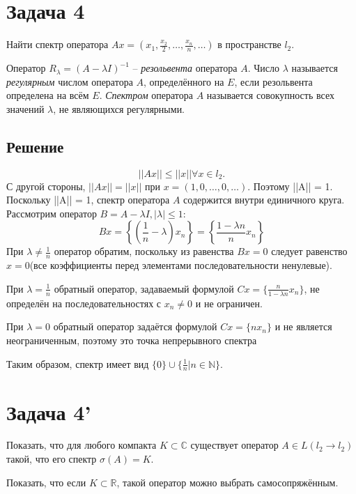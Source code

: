 \documentclass[11pt]{article}
\newcounter{th}\setcounter{th}{0}
\begin{document}
\section{Задача 4}
\label{sec:org17967b7}
Найти спектр оператора \(Ax = (x_1, \frac{x_2}2, \ldots, \frac{x_n}n, \ldots)\) в пространстве \(l_2\).

Оператор \(R_{\lambda} = (A - \lambda I)^{-1}\) -- \emph{резольвента} оператора \(A\). Число \(\lambda\) называется \emph{регулярным} числом оператора \(A\), определённого на \(E\), если резольвента определена на всём \(E\). \emph{Спектром} оператора \(A\) называется совокупность всех значений \(\lambda\), не являющихся регулярными.
\subsection{Решение}
\label{sec:org160b67c}
\begin{equation*}
||Ax|| \leq ||x|| \forall x \in l_2.
\end{equation*}
С другой стороны, $||Ax|| = ||x||$ при $x = (1, 0, \ldots, 0, \ldots)$. Поэтому ||A|| = 1.
Поскольку ||A|| = 1, спектр оператора \(A\) содержится внутри единичного круга. Рассмотрим оператор \(B = A - \lambda I, |\lambda| \leq 1\):
\begin{equation}
Bx = \left\{\left(\frac1n - \lambda\right)x_n\right\} = \left\{\frac{1 - \lambda n}nx_n\right\}
\end{equation}
При $\lambda \neq \frac1n$ оператор обратим, поскольку из равенства $Bx = 0$ следует равенство $x = 0$(все коэффициенты перед элементами последовательности ненулевые).

При $\lambda = \frac1n$ обратный оператор, задаваемый формулой $Cx = \{\frac{n}{1 - \lambda n}x_n\}$, не определён на последовательностях с $x_n \neq 0$ и не ограничен.

При $\lambda = 0$ обратный оператор задаётся формулой $Cx = \{nx_n\}$ и не является неограниченным, поэтому это точка непрерывного спектра

Таким образом, спектр имеет вид $\{0\} \cup\{\frac1n | n \in \mathbb{N}\}$.
\section{Задача 4'}
\label{sec:orgd7f9d52}
Показать, что для любого компакта \(K \subset \mathbb{C}\) существует оператор \(A \in L(l_2 \rightarrow l_2)\) такой, что его спектр \(\sigma(A) = K\).

Показать, что если \(K \subset \mathbb{R}\), такой оператор можно выбрать самосопряжённым.
\end{document}
